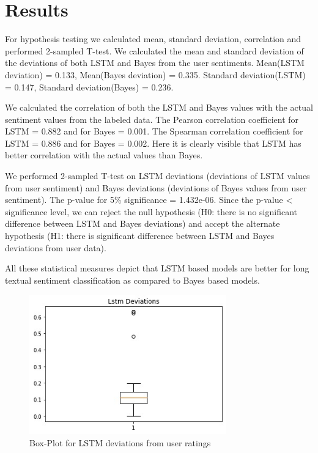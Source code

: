 \documentclass[sigplan,screen]{acmart}
\begin{document}
\section{Results}
For hypothesis testing we calculated mean, standard deviation, correlation and performed 2-sampled T-test. We calculated the mean and standard deviation of the deviations of both LSTM and Bayes from the user sentiments. Mean(LSTM deviation) = 0.133, Mean(Bayes deviation) = 0.335. Standard deviation(LSTM) = 0.147, Standard deviation(Bayes) = 0.236.

We calculated the correlation of both the LSTM and Bayes values with the actual sentiment values from the labeled data. The Pearson correlation coefficient for LSTM = 0.882 and for Bayes = 0.001.
The Spearman correlation coefficient for LSTM = 0.886 and for Bayes = 0.002. Here it is clearly visible that LSTM has better correlation with the actual values than Bayes.

We performed 2-sampled T-test on LSTM deviations (deviations of LSTM values from user sentiment) and Bayes deviations (deviations of Bayes values from user sentiment). The p-value for 5\% significance = 1.432e-06. Since the p-value < significance level, we can reject the null hypothesis (H0: there is no significant difference between LSTM and Bayes deviations) and accept the alternate hypothesis (H1: there is significant difference between LSTM and Bayes deviations from user data).

All these statistical measures depict that LSTM based models are better for long textual sentiment classification as compared to Bayes based models.

\begin{figure}[h]
    \includegraphics[width=8.5cm]{LSTM_boxPlot.jpeg}
    \caption{Box-Plot for LSTM deviations from user ratings}
    \label{fig:ss 1}
\end{figure}
\end{document}
